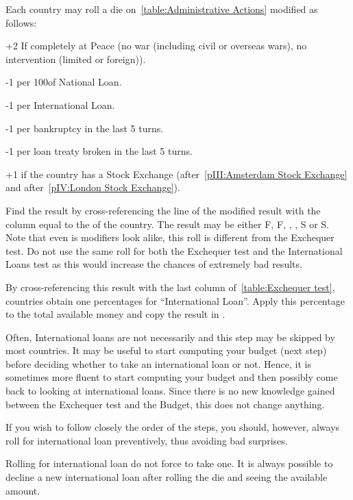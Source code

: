  Each country may roll a die
on~\ref{table:Administrative Actions} modified as follows:
\begin{modlist}
\item[+2] If completely at Peace (no war (including civil or overseas wars),
  no intervention (limited or foreign)).
\item[-1 ] per 100\ducats of National Loan.
\item[-1] per International Loan.
\item[-1 ] per bankruptcy in the last 5 turns.
\item[-1] per loan treaty broken in the last 5 turns.
\item[+1 ] if the country has a Stock Exchange (\HOL after~\ref{pIII:Amsterdam
    Stock Exchange} and \ANG after~\ref{pIV:London Stock Exchange}).
\end{modlist}
\bparag Find the result by cross-referencing the line of the modified result
with the column equal to the \STAB of the country.
\bparag The result may be either F\textetoile, F, \undemi, \undemi\textetoile,
S or S\textetoile.
\bparag Note that even is modifiers look alike, this roll is different from
the Exchequer test. Do not use the same roll for both the Exchequer test and
the International Loans test as this would increase the chances of extremely
bad results.

 By cross-referencing this result with the last
column of~\ref{table:Exchequer test}, countries obtain one percentages for
``International Loan''.
\bparag Apply this percentage to the total available money and copy the result
in .

\begin{playtip}
  Often, International loans are not necessarily and this step may be skipped
  by most countries. It may be useful to start computing your budget (next
  step) before deciding whether to take an international loan or not. Hence,
  it is sometimes more fluent to start computing your budget and then possibly
  come back to looking at international loans. Since there is no new knowledge
  gained between the Exchequer test and the Budget, this does not change
  anything.

  If you wish to follow closely the order of the steps, you should, however,
  always roll for international loan preventively, thus avoiding bad
  surprises.

  Rolling for international loan do not force to take one. It is always
  possible to decline a new international loan after rolling the die and
  seeing the available amount.
\end{playtip}


